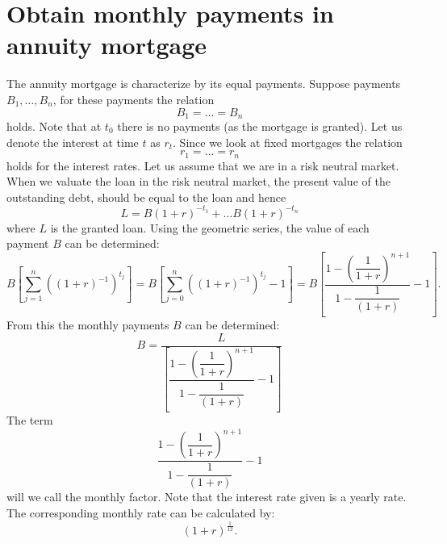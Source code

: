 \section{Obtain monthly payments in annuity mortgage}
    The annuity mortgage is characterize by its equal payments. 
    Suppose payments $B_1, \ldots, B_n$, for these payments the relation
    \begin{equation}
        B_1 = \ldots = B_n 
    \end{equation}
    holds. Note that at $t_0$ there is no payments (as the mortgage is granted).
    Let us denote the interest at time $t$ as $r_t$. Since we look at fixed mortgages 
    the relation
    \begin{equation}
        r_1 = \ldots = r_n
    \end{equation}
    holds for the interest rates. 
    Let us assume that we are in a risk neutral market. When we valuate the loan in the risk 
    neutral market, the present value of the outstanding debt, should be equal to the loan
    and hence
    \begin{equation}
        L = B (1 + r)^{-t_1} + \ldots B (1 + r)^{-t_n}
    \end{equation}
    where $L$ is the granted loan. Using the geometric series, the value of each payment 
    $B$ can be determined: 
    \begin{equation}
        B\left[
            \displaystyle\sum_{j=1}^{n} \left(
                (1 + r)^{-1}
                \right)^{t_j}  
        \right] = 
        B\left[
            \displaystyle\sum_{j=0}^{n} \left(
                (1 + r)^{-1}
                \right)^{t_j} - 1  
        \right] = 
        B \left[
            \dfrac{
                1 - \left(
                    \dfrac{1}{1 + r}
                \right)^{n+1}
                }
                {
                    1 - \dfrac{1}{(1 + r)}
                } - 1
        \right].
    \end{equation}
    From this the monthly payments $B$ can be determined: 
    \begin{equation}
        B = \dfrac{L}{
                \left[
                    \dfrac{
                        1 - \left(
                            \dfrac{1}{1 + r}
                        \right)^{n+1}
                        }
                        {
                            1 - \dfrac{1}{(1 + r)}
                        } - 1
                \right]        
            }
    \end{equation}
    The term 
    \begin{equation}
        \dfrac{
            1 - \left(
                \dfrac{1}{1 + r}
            \right)^{n+1}
            }
            {
                1 - \dfrac{1}{(1 + r)}
            } - 1
    \end{equation}
    will we call the monthly factor. Note that the interest rate given is a yearly rate. The 
    corresponding monthly rate can be calculated by: 
    \begin{equation}
        (1 + r)^{\frac{1}{12}}.
    \end{equation} 


